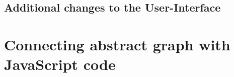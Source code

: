 	\subsection{Additional changes to the User-Interface}
	
\section{Connecting abstract graph with JavaScript code}
	
